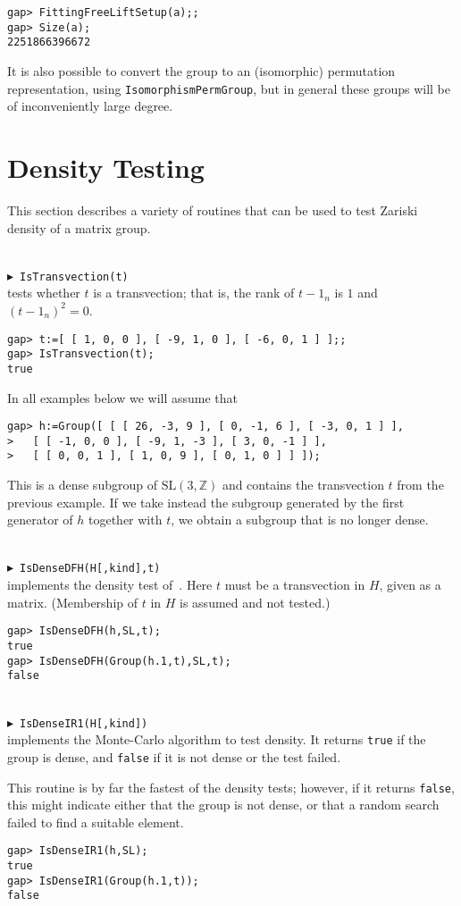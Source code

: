 \documentclass[a4paper,12pt]{amsart}
\newcommand{\Z}{\mathbb{Z}}
\newcommand{\SL}{\mathrm{SL}}
\def\mycmd#1{\ \smallskip\\$\blacktriangleright$\ #1\\}
\begin{document}
\begin{verbatim}
gap> FittingFreeLiftSetup(a);;
gap> Size(a);
2251866396672
\end{verbatim}

It is also possible to convert the group to an (isomorphic) permutation
representation, using {\tt IsomorphismPermGroup}, but in general these groups will be of inconveniently large
degree.

\section{Density Testing}

This section describes a variety of routines that can be used to test
Zariski density of a matrix group.

\mycmd{{\tt IsTransvection(t)}}
tests whether $t$ is a transvection; that is, the rank of $t-1_n$ is $1$ and
$(t-1_n)^2=0$.
\begin{verbatim}
gap> t:=[ [ 1, 0, 0 ], [ -9, 1, 0 ], [ -6, 0, 1 ] ];;
gap> IsTransvection(t);
true
\end{verbatim}

In all examples below we will assume that
\begin{verbatim}
gap> h:=Group([ [ [ 26, -3, 9 ], [ 0, -1, 6 ], [ -3, 0, 1 ] ],
>   [ [ -1, 0, 0 ], [ -9, 1, -3 ], [ 3, 0, -1 ] ],
>   [ [ 0, 0, 1 ], [ 1, 0, 9 ], [ 0, 1, 0 ] ] ]);
\end{verbatim}
This is a dense subgroup of $\SL(3,\Z)$ and contains the transvection $t$
from the previous example. If we take instead the subgroup generated by the
first generator of $h$ together with $t$, we obtain a subgroup that is no
longer dense.

\mycmd{{\tt IsDenseDFH(H[,kind],t)}}
implements the density test of~\cite{Density}.
Here $t$ must be a transvection in $H$, given as a matrix. (Membership of
$t$ in $H$ is assumed and not tested.)
\begin{verbatim}
gap> IsDenseDFH(h,SL,t);
true
gap> IsDenseDFH(Group(h.1,t),SL,t);
false
\end{verbatim}

\mycmd{{\tt IsDenseIR1(H[,kind])}}
implements the Monte-Carlo algorithm \cite[Algorithm~1]{Rivin1} to test
density. It returns {\tt true} if the group is dense, and {\tt false} if it
is not dense or the test failed.

This routine is by far the fastest of the density tests; however, if it
returns {\tt false}, this might indicate either that the group is not dense,
or that a random search failed to find a suitable element.
\begin{verbatim}
gap> IsDenseIR1(h,SL);
true
gap> IsDenseIR1(Group(h.1,t));
false
\end{verbatim}
\end{document}
